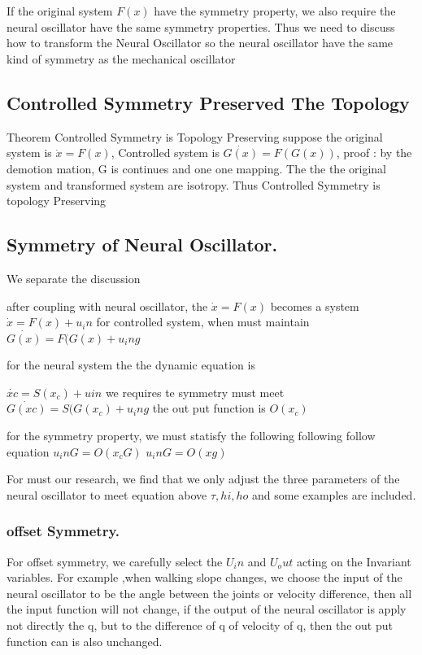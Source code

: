 If the original system $F(x)$ have the symmetry property, we also require the neural oscillator have the same symmetry properties.
Thus we need to discuss how to transform the Neural Oscillator so the neural oscillator have the same kind of symmetry as the mechanical oscillator



\subsection{ Controlled Symmetry Preserved The Topology}

Theorem Controlled Symmetry is Topology Preserving
suppose the original system is $\dot{x}=F(x)$, Controlled system is $\dot{G(x)}=F(G(x))$,
proof :
	by the demotion mation, G is continues and one one mapping.
	The the the original system and transformed system are isotropy.
	Thus Controlled Symmetry is topology Preserving


\subsection{ Symmetry of Neural Oscillator.}
We separate the discussion

after coupling with neural oscillator, the $\dot{x}=F(x)$ becomes a system 
$\dot{x}=F(x)+u_in$
for controlled system, when must maintain
$\dot{G(x)}=F(G(x)+u_ing$

for the neural system
the the dynamic equation is

$\dot{xc}=S(x_c)+uin$
we requires te symmetry must meet
$\dot{G(xc)}=S(G(x_c)+u_ing$
the out put function is
$O(x_c)$


for the symmetry property, we must statisfy the following following follow equation
$u_inG=O(x_cG)$
$u_inG=O(xg)$

For must our research, we find that we only adjust the three parameters of the neural oscillator to meet equation above
$\tau,hi,ho$
and some examples are included.

\subsubsection*{ offset Symmetry.}
For offset symmetry, we carefully select the $U_in$ and $U_out$ acting on the Invariant variables.
For example ,when walking slope changes, we choose the input of the neural oscillator to be the angle between the joints or velocity difference,
then all the input function will not change, if the output of the neural oscillator is apply not directly the q, but to the difference of q of velocity of q,
then the out put function can is also unchanged.


